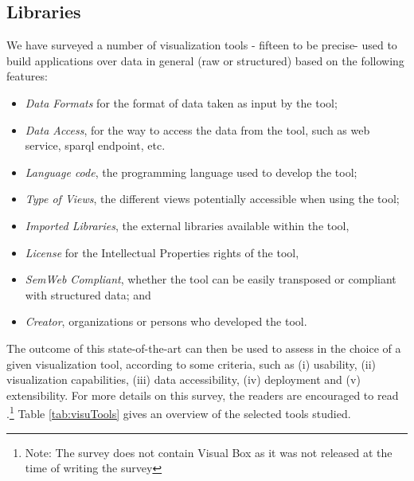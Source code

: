 \subsection{Libraries } \label{sec:frame}
We have surveyed a number of visualization tools - fifteen to be precise- used to build applications over data in general (raw or structured) based on the following features:
\begin{itemize}
\item \textit{Data Formats} for the format of data taken as input by the tool;
\item \textit{Data Access}, for the way to access the data from the tool, such as web service, sparql endpoint, etc.
\item \textit{Language code}, the programming language used to develop the tool;
\item \textit{Type of Views}, the different views potentially accessible when using the tool;
\item \textit{Imported Libraries}, the external libraries available within the tool,
\item \textit{License} for the Intellectual Properties rights of the tool,
\item \textit{SemWeb Compliant}, whether the tool can be easily transposed or compliant with structured data; and 
\item \textit{Creator}, organizations or persons who developed the tool.

\end{itemize}
The outcome of this state-of-the-art can then be used to assess in the choice of a given visualization tool, according to some criteria, such as (i) usability, (ii) visualization capabilities, (iii) data accessibility, (iv) deployment and (v) extensibility. For more details on this survey, the readers are encouraged to read \cite{deliverable2012b}.\footnote{Note: The survey does not contain Visual Box as it was not released at the time of writing the survey} Table \ref{tab:visuTools} gives an overview of the selected tools studied.

